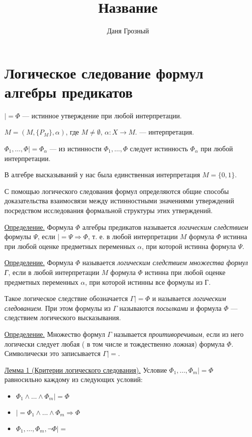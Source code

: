 \documentclass{article}
\title{Название}
\author{Даня Грозный}
\begin{document}
\section{Логическое следование формул алгебры предикатов}
$|= \Phi$ --- истинное утверждение при любой интерпретации.

$M = (M, \{P_M\}, \alpha)$, где $M \neq \emptyset$, $\alpha: X \rightarrow M$. --- интерпретация.

$\Phi_1, \dots, \Phi |= \Phi_\alpha$ --- из истинности $\Phi_1, \dots, \Phi$ следует истинность $\Phi_\alpha$ при любой интерпретации.

В алгебре высказываний у нас была единственная интерпретация $M = \{0,1\}$.

С помощью логического следования формул определяются общие способы доказательства взаимосвязи между истинностными значениями утверждений посредством исследования формальной структуры этих утверждений.

\underline{Определение.} Формула $\Phi$ алгебры предикатов называется {\it логическим следствием } формулы $\Psi$, если $|= \Psi \Rightarrow \Phi$, т. е. в любой интерпретации $M$ формула $\Phi$ истинна при любой оценке предметных переменных $\alpha$, при которой истинна формула $\Psi$.

\underline{Определение.} Формула $\Phi$ называется {\it логическим следствием множества формул Г}, если в любой интерпретации $M$ формула $\Phi$ истинна при любой оценке предметных переменных $\alpha$, при которой истинны все формулы из Г.

Такое логическое следствие обозначается $\Gamma |= \Phi$ и называется {\it логическим следованием}. При этом формулы из $\Gamma$ называются {\it посылками} и формула $\Phi$ --- следствием логического высказывания.

\underline{Определение.} Множество формул $\Gamma$ называется {\it проитиворечивым}, если из него логически следует любая ( в том числе и тождественно ложная) формула $\Phi$. Символически это записывается $\Gamma |= $.

\underline{Лемма 1 (Критерии логического следования).} Условие $\Phi_1, \dots, \Phi_m |= \Phi$ равносильно каждому из следующих условий:
\begin{itemize}
    \item $\Phi_1 \land \dots \land \Phi_m |= \Phi$
    \item $|= \Phi_1 \land \dots \land \Phi_m \Rightarrow \Phi$
    \item $\Phi_1, \dots, \Phi_m, \neg \Phi |= $
\end{itemize}
\end{document}

